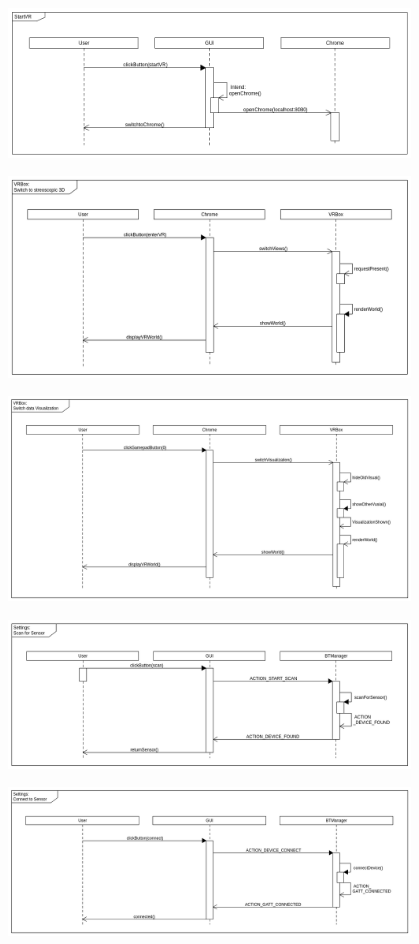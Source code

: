 \includegraphics[width=0.8\textwidth]{diagramms/startVR.png}

\includegraphics[width=0.8\textwidth]{diagramms/stereo.png}

\includegraphics[width=0.8\textwidth]{diagramms/switchVisual.png}

\includegraphics[width=0.8\textwidth]{diagramms/settingsScanForSensor.png}

\includegraphics[width=0.8\textwidth]{diagramms/connectSensor.png}

